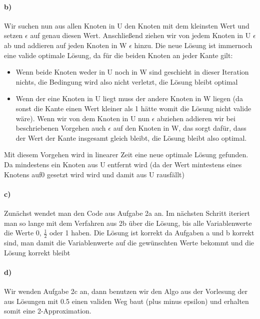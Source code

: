 \documentclass[a4paper]{article}
\begin{document}
\paragraph{b)}
Wir suchen nun aus allen Knoten in U den Knoten mit dem kleinsten Wert
und setzen $\epsilon$ auf genau diesen Wert. Anschließend ziehen wir von jedem
Knoten in U $\epsilon$ ab und addieren auf jeden Knoten in W $\epsilon$ hinzu.
Die neue Lösung ist immernoch eine valide optimale Lösung, da für die beiden
Knoten an jeder Kante gilt: \\
\begin{itemize}
    \item Wenn beide Knoten weder in U noch in W sind geschieht in dieser
          Iteration nichts, die Bedingung wird also nicht verletzt, die Lösung
          bleibt optimal
    \item Wenn der eine Knoten in U liegt muss der andere Knoten in W liegen
          (da sonst die Kante einen Wert kleiner als 1 hätte womit die Lösung
          nicht valide wäre). Wenn wir von dem Knoten in U nun $\epsilon$ abziehen
          addieren wir bei beschriebenen Vorgehen auch $\epsilon$ auf den Knoten in
          W, das sorgt dafür, dass der Wert der Kante insgesamt gleich bleibt, die
          Lösung bleibt also optimal.
\end{itemize}
Mit diesem Vorgehen wird in linearer Zeit eine neue optimale Lösung gefunden.
Da mindestens ein Knoten aus U entfernt wird (da der Wert mintestens eines
Knotens auf0 gesetzt wird wird und damit aus U rausfällt)
\paragraph*{c)}
Zunächst wendet man den Code aus Aufgabe 2a an. Im nächsten Schritt iteriert
man so lange mit dem Verfahren aus 2b über die Lösung, bis alle Variablenwerte
die Werte 0, $\frac{1}{2}$ oder 1 haben. Die Lösung ist korrekt da Aufgaben
a und b korrekt sind, man damit die Variablenwerte auf die gewünschten Werte
bekommt und die Lösung korrekt bleibt
\paragraph*{d)}
Wir wenden Aufgabe 2c an, dann benutzen wir den Algo aus der Vorlesung der aus
Lösungen mit 0.5 einen validen Weg baut (plus minus epsilon) und erhalten
somit eine 2-Approximation.
\end{document}
